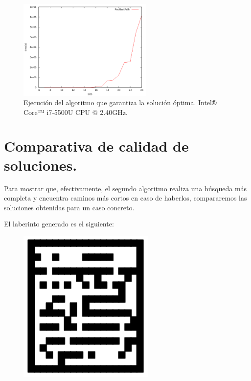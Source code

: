 \documentclass[11pt,a4paper]{article}
\begin{document}
				\begin{figure}[h]

					\centering
					\includegraphics[width=0.59\textwidth]{FindBestPath.png}
					\caption{Ejecución del algoritmo que garantiza la solución óptima. Intel® Core™ i7-5500U CPU @ 2.40GHz.}
					
				\end{figure}

\newpage

	\section{Comparativa de calidad de soluciones.}

		\par
		Para mostrar que, efectivamente, el segundo algoritmo realiza una búsqueda más completa y encuentra caminos más cortos en caso de haberlos, compararemos las soluciones obtenidas para un caso concreto.

		\par
		El laberinto generado es el siguiente:

		\vspace{5mm}

		\begin{figure}[h]

			\centering
			\includegraphics[width=0.6\textwidth]{Maze19.png}
			
		\end{figure}
\end{document}
